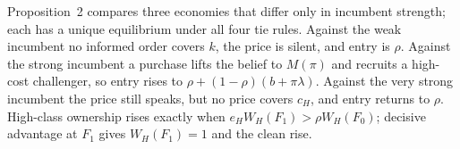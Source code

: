 \begin{chaptersummary}
Proposition~2 compares three economies that differ only in incumbent strength; each has a unique equilibrium under
all four tie rules. Against the weak incumbent no informed order covers \(k\), the price is silent, and entry is
\(\rho\). Against the strong incumbent a purchase lifts the belief to \(M(\pi)\) and recruits a high-cost
challenger, so entry rises to \(\rho+(1-\rho)(b+\pi\lambda)\). Against the very strong incumbent the price still
speaks, but no price covers \(c_H\), and entry returns to \(\rho\). High-class ownership rises exactly when
\(e_HW_H(F_1)>\rho W_H(F_0)\); decisive advantage at \(F_1\) gives \(W_H(F_1)=1\) and the clean rise.
\end{chaptersummary}
